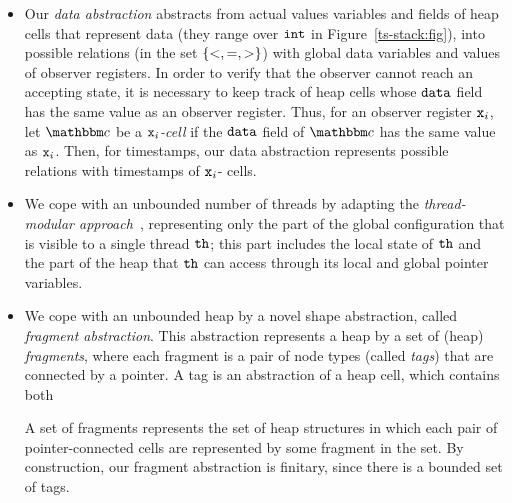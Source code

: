 \begin{itemize}
  \item
    Our {\em data abstraction} abstracts from actual values variables and
    fields of heap cells that represent data (they range over $\tt int$
    in Figure~\ref{ts-stack:fig}),
    into possible relations
    (in the set $\left\{<,=,>\right\}$) with global data variables and values of
    observer registers. 
    In order to verify that the observer cannot reach an accepting state,
    it is necessary to
    keep track of heap cells whose ${\tt data}$ field has the same value as an
    observer register. Thus, 
    for an observer register $\mathtt{x}_i$, let $\cell$ be a {\em $\mathtt{x}_i$-cell} if
    the ${\tt data}$ field of $\cell$ has the same value as $\mathtt{x}_i$.
    Then, for timestamps, our data abstraction represents
    possible relations with timestamps of $\mathtt{x}_i$- cells.
  \item
We cope with an unbounded number of threads by
adapting the {\em thread-modular approach}~\cite{BLMRS:cav08},
representing only the part of the global configuration that is visible to
a single thread ${\tt th}$; this part includes the local state of ${\tt th}$ and
the part of the heap that ${\tt th}$ can access through its local
and global pointer variables.
\item
  We cope with an unbounded heap by a novel shape abstraction, 
called {\em fragment abstraction}. This abstraction 
represents a heap by a set of (heap) {\em fragments}, where each fragment is
a pair of node types (called {\em tags}) that are connected by a pointer.
A tag is an abstraction of a heap cell, which contains both 
A set of fragments represents the set of heap structures in which each
pair of pointer-connected cells are represented by some fragment in the set.
By construction, our fragment abstraction is finitary, since there is
a bounded set of tags.
\end{itemize}
